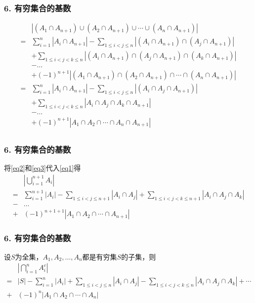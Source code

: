 \documentclass{beamer}
\begin{document}
\begin{CJK*}{UTF8}{gbsn}
\begin{frame}
  \frametitle{6. 有穷集合的基数}
  \small{
  \begin{equation}\label{eq3}
    \begin{split}
      &|(A_1 \cap A_{n+1}) \cup (A_2 \cap A_{n+1}) \cup \cdots \cup (A_n \cap A_{n+1})|\\
      =&\sum_{i=1}^n|A_i \cap A_{n+1}| - \sum_{1\leq i < j \leq n}|(A_i \cap A_{n+1}) \cap (A_j \cap A_{n+1}) |\\
      &+ \sum_{1 \leq  i < j < k \leq n}|(A_i \cap A_{n+1}) \cap (A_j \cap A_{n+1}) \cap (A_k \cap A_{n+1})|\\
&-\ldots\\
&+(-1)^{n+1}|(A_1 \cap A_{n+1}) \cap (A_2 \cap A_{n+1}) \cap \cdots \cap (A_n \cap A_{n+1})| \\
      =&\sum_{i=1}^n|A_i \cap A_{n+1}| - \sum_{1\leq i < j \leq n}|(A_i  \cap A_j \cap A_{n+1}) |\\
      &+ \sum_{1 \leq  i < j < k \leq n}|A_i  \cap A_j  \cap A_k \cap A_{n+1}|\\
&-\ldots\\
&+(-1)^{n+1}|A_1  \cap A_2  \cap \cdots \cap A_n \cap A_{n+1}| \\
    \end{split}
  \end{equation}}
\end{frame}
\begin{frame}
  \frametitle{6. 有穷集合的基数}
  将\eqref{eq2}和\eqref{eq3}代入\eqref{eq1}得
  \begin{equation*}
    \begin{split}
    &|\bigcup_{i=1}^{n+1}A_i|\\
=&\sum_{i=1}^{n+1}|A_i| - \sum_{1\leq i < j \leq {n+1}}|A_i \cap A_j| + \sum_{1 \leq  i < j < k \leq {n+1}}|A_i \cap A_j \cap A_k|\\
-&\ldots\\
+&(-1)^{n+1+1}|A_1 \cap A_2 \cap \cdots \cap A_{n+1}|
\end{split}
\end{equation*}
\end{frame}
\begin{frame}
\frametitle{6. 有穷集合的基数}
\begin{Thm}
  设$S$为全集，$A_1, A_2, \ldots, A_n$都是有穷集$S$的子集，则
  \begin{equation*}
    \begin{split}
      &|\bigcap_{i=1}^nA_{i}^c|\\
=&|S| - \sum_{i=1}^n|A_i| + \sum_{1\leq i < j \leq n}|A_i \cap A_j|
-\sum_{1 \leq  i < j < k \leq n}|A_i \cap A_j \cap A_k| + \cdots \\
+&(-1)^n|A_1 \cap A_2 \cap \cdots \cap A_n|
    \end{split}
  \end{equation*}
\end{Thm}
\end{frame}


\end{CJK*}
\end{document}
